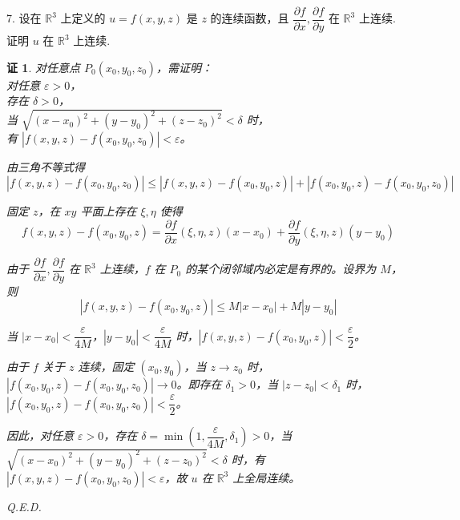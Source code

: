 \documentclass[a4paper,12pt]{article}
\newtheorem*{pf}{证}
\begin{document}
7. 设在 $\mathbb{R}^3$ 上定义的 $u=f(x,y,z)$ 是 $z$ 的连续函数，且 $\dfrac{\partial f}{\partial x},\dfrac{\partial f}{\partial y}$ 在 $\mathbb{R}^3$ 上连续. 证明 $u$ 在 $\mathbb{R}^3$ 上连续.
\begin{pf}
    对任意点 $P_0(x_0, y_0, z_0)$，需证明：\\
    对任意 $\varepsilon > 0$，\\
    存在 $\delta > 0$，\\
    当 $\sqrt{(x-x_0)^2+(y-y_0)^2+(z-z_0)^2} < \delta$ 时，\\
    有 $|f(x,y,z) - f(x_0,y_0,z_0)| < \varepsilon$。

    由三角不等式得
    $$
        |f(x,y,z) - f(x_0,y_0,z_0)| \leq |f(x,y,z) - f(x_0,y_0,z)| + |f(x_0,y_0,z) - f(x_0,y_0,z_0)|
    $$

    固定 $z$，在 $xy$ 平面上存在 $\xi,\eta$ 使得
    $$
        f(x,y,z) - f(x_0,y_0,z) = \dfrac{\partial f}{\partial x}(\xi, \eta, z)(x-x_0) + \dfrac{\partial f}{\partial y}(\xi, \eta, z)(y-y_0)
    $$

    由于 $\dfrac{\partial f}{\partial x}, \dfrac{\partial f}{\partial y}$ 在 $\mathbb{R}^3$ 上连续，$f$ 在 $P_0$ 的某个闭邻域内必定是有界的。设界为 $M$，则
    $$
        |f(x,y,z) - f(x_0,y_0,z)| \le M|x-x_0| + M|y-y_0|
    $$

    当 $|x-x_0| < \dfrac{\varepsilon}{4M}$，$|y-y_0| < \dfrac{\varepsilon}{4M}$ 时，$|f(x,y,z) - f(x_0,y_0,z)|<\dfrac{\varepsilon}{2}$。

    由于 $f$ 关于 $z$ 连续，固定 $(x_0, y_0)$，当 $z \to z_0$ 时，$|f(x_0,y_0,z) - f(x_0,y_0,z_0)| \to 0$。即存在 $\delta_1 > 0$，当 $|z-z_0| < \delta_1$ 时，$|f(x_0,y_0,z) - f(x_0,y_0,z_0)|< \dfrac{\varepsilon}{2}$。

    因此，对任意 $\varepsilon > 0$，存在 $\delta = \min\left(1, \dfrac{\varepsilon}{4M}, \delta_1\right) > 0$，当 $\sqrt{(x-x_0)^2+(y-y_0)^2+(z-z_0)^2} < \delta$ 时，有 $|f(x,y,z) - f(x_0,y_0,z_0)| < \varepsilon$，故 $u$ 在 $\mathbb{R}^3$ 上全局连续。

    Q.E.D.
\end{pf}
\end{document}
